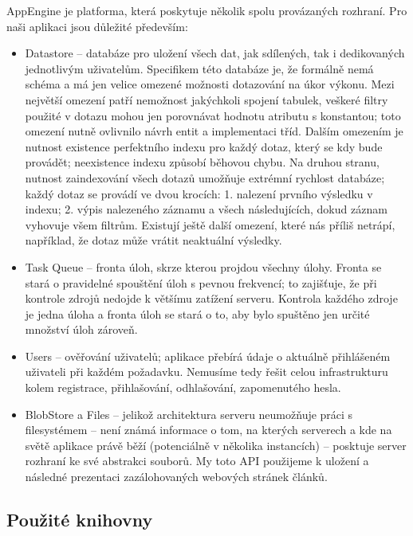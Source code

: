AppEngine je platforma, která poskytuje několik spolu provázaných rozhraní.
Pro naši aplikaci jsou důležité především:
\begin{itemize}
    \item Datastore -- databáze pro uložení všech dat, jak sdílených, tak i dedikovaných jednotlivým uživatelům.
        Specifikem této databáze je, že formálně nemá schéma a má jen velice omezené možnosti dotazování na úkor výkonu.
        Mezi největší omezení patří nemožnost jakýchkoli spojení tabulek, veškeré filtry použité v dotazu mohou jen porovnávat hodnotu atributu s konstantou; toto omezení nutně ovlivnilo návrh entit a implementaci tříd.
        Dalším omezením je nutnost existence perfektního indexu pro každý dotaz, který se kdy bude provádět; neexistence indexu způsobí běhovou chybu.
        Na druhou stranu, nutnost zaindexování všech dotazů umožňuje extrémní rychlost databáze; každý dotaz se provádí ve dvou krocích:
        1. nalezení prvního výsledku v indexu; 2. výpis nalezeného záznamu a všech následujících, dokud záznam vyhovuje všem filtrům.
        Existují ještě další omezení, které nás příliš netrápí, například, že dotaz může vrátit neaktuální výsledky.
    \item Task Queue -- fronta úloh, skrze kterou projdou všechny úlohy.
        Fronta se stará o pravidelné spouštění úloh s pevnou frekvencí; to zajišťuje, že při kontrole zdrojů nedojde k většímu zatížení serveru.
        Kontrola každého zdroje je jedna úloha a fronta úloh se stará o to, aby bylo spuštěno jen určité množství úloh zároveň.
    \item Users -- ověřování uživatelů; aplikace přebírá údaje o aktuálně přihlášeném uživateli při každém požadavku.
        Nemusíme tedy řešit celou infrastrukturu kolem registrace, přihlašování, odhlašování, zapomenutého hesla.
    \item BlobStore a Files -- jelikož architektura serveru neumožňuje práci s filesystémem -- není známá informace o tom, na kterých serverech a kde na světě aplikace právě běží (potenciálně v několika instancích) -- posktuje server rozhraní ke své abstrakci souborů.
        My toto API použijeme k uložení a následné prezentaci zazálohovaných webových stránek článků.
\end{itemize}

\subsection{Použité knihovny}

